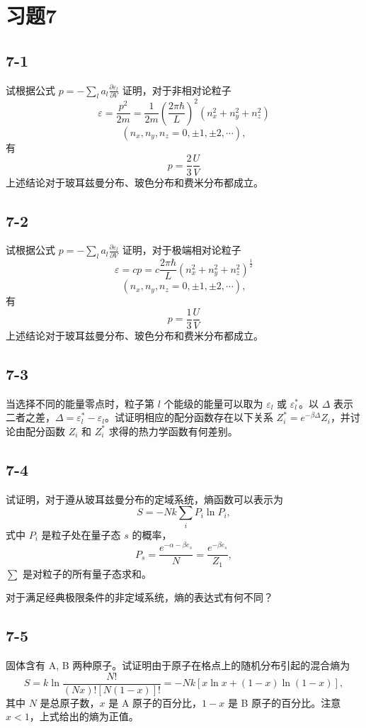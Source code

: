 \section{习题7}

\newpage
\subsection{7-1}
试根据公式 $p = - \sum_{l} a_{l} \frac{\partial \varepsilon_{l}}{\partial V}$ 证明，对于非相对论粒子
$$\varepsilon = \frac{p^{2}}{2m} = \frac{1}{2m} \left( \frac{2\pi \hbar}{L} \right)^{2} (n_{x}^{2} + n_{y}^{2} + n_{z}^{2})$$
$$(n_{x}, n_{y}, n_{z} = 0, \pm 1, \pm 2, \cdots),$$
有
$$p = \frac{2}{3} \frac{U}{V}$$
上述结论对于玻耳兹曼分布、玻色分布和费米分布都成立。

\newpage
\subsection{7-2}
试根据公式 $p = - \sum_{l} a_{l} \frac{\partial \varepsilon_{l}}{\partial V}$ 证明，对于极端相对论粒子
$$\varepsilon = cp = c \frac{2 \pi \hbar}{L} (n_{x}^{2} + n_{y}^{2} + n_{z}^{2})^{\frac{1}{2}}$$
$$(n_{x}, n_{y}, n_{z} = 0, \pm 1, \pm 2, \cdots ),$$
有
$$p = \frac{1}{3} \frac{U}{V}$$
上述结论对于玻耳兹曼分布、玻色分布和费米分布都成立。

\newpage
\subsection{7-3}
当选择不同的能量零点时，粒子第 $l$ 个能级的能量可以取为 $\varepsilon_l$ 或 $\varepsilon_l^*$。以 $\Delta$ 表示二者之差，$\Delta = \varepsilon_l^* - \varepsilon_l$。试证明相应的配分函数存在以下关系 $Z_i^* = e^{-\beta\Delta}Z_i$，并讨论由配分函数 $Z_i$ 和 $Z_i^*$ 求得的热力学函数有何差别。

\newpage
\subsection{7-4}
试证明，对于遵从玻耳兹曼分布的定域系统，熵函数可以表示为
$$S = -Nk \sum_i P_i \ln P_i,$$
式中 $P_i$ 是粒子处在量子态 $s$ 的概率，
$$P_s = \frac{e^{-\alpha - \beta e_s}}{N} = \frac{e^{-\beta e_s}}{Z_1},$$
$\sum$ 是对粒子的所有量子态求和。

对于满足经典极限条件的非定域系统，熵的表达式有何不同？

\newpage
\subsection{7-5}
固体含有 A, B 两种原子。试证明由于原子在格点上的随机分布引起的混合熵为
$$S = k \ln \frac{N!}{(Nx)! [N(1-x)]!} = -Nk [x \ln x + (1-x) \ln (1-x)] ,$$
其中 $N$ 是总原子数，$x$ 是 A 原子的百分比，$1-x$ 是 B 原子的百分比。注意 $x < 1$，上式给出的熵为正值。

